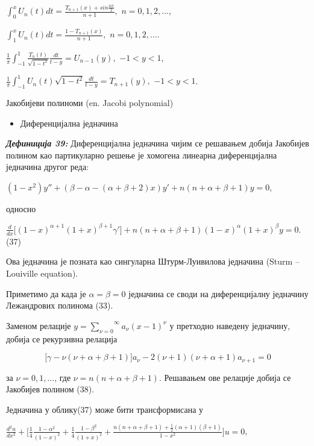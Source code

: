 \(\int_{0}^{x}U_{n}(t)dt = \frac{T_{n + 1}\overset{}{(x)} + sin\frac{n\pi}{2}}{n + 1},\)
\(n = 0,1,2,...\),

\(\int_{1}^{x}U_{n}(t)dt = \frac{1 - T_{n + 1}\overset{}{(x)}}{n + 1},\)
\(n = 0,1,2,...\).

\(\frac{1}{\pi}\int_{- 1}^{1}\frac{T_{n}\overset{}{(t)}}{\sqrt{1 - t^{2}}}\frac{dt}{t - y} = U_{n - 1}(y),\)
\(- 1 < y < 1\),

\(\frac{1}{\pi}\int_{- 1}^{1}U_{n}(t)\sqrt{1 - t^{2}}\frac{dt}{t - y} = T_{n + 1}(y),\)
\(- 1 < y < 1\).

Јакобијеви полиноми (en. Jacobi polynomial)

\begin{itemize}
\item
  Диференцијална једначина
\end{itemize}

\emph{\textbf{Дефиниција 39:}} Диференцијална једначина чијим се
решавањем добија Јакобијев полином као партикуларно решење је хомогена
линеарна диференцијална једначина другог реда:

\((1 - x^{2})y'' + (\beta - \alpha - (\alpha + \beta + 2)x)y' + n(n + \alpha + \beta + 1)y = 0\),

односно

\(\frac{d}{dx}\lbrack{(1 - x)}^{\alpha + 1}{(1 + x)}^{\beta + 1}\gamma'\rbrack + n(n + \alpha + \beta + 1){(1 - x)}^{\alpha}{(1 + x)}^{\beta}y = 0\).
(37)

Ова једначина је позната као сингуларна Штурм-Луивилова једначина (Sturm
-- Louiville equation).

Приметимо да када је \(\alpha = \beta = 0\) једначина се своди на
диференцијалну једначину Лежандрових полинома (33).

Заменом релације
\(y = \overset{\infty}{\sum_{\nu = 0}}a_{\nu}{(x - 1)}^{\nu}\) у
претходно наведену једначину, добија се рекурзивна релација

\[\lbrack\gamma - \nu(\nu + \alpha + \beta + 1)\rbrack a_{\nu} - 2(\nu + 1)(\nu + \alpha + 1)a_{\nu + 1} = 0\]

за \(\nu = 0,1,...\), где \(\nu = n(n + \alpha + \beta + 1)\). Решавањем
ове релације добија се Јакобијев полином (38).

Једначина у облику(37) може бити трансформисана у

\(\frac{d^{2}u}{dx^{2}} + \lbrack\frac{1}{4}\frac{1 - \alpha^{2}}{{(1 - x)}^{2}} + \frac{1}{4}\frac{1 - \beta^{2}}{{(1 + x)}^{2}} + \frac{n(n + \alpha + \beta + 1) + \frac{1}{2}(\alpha + 1)(\beta + 1)}{1 - x^{2}}\rbrack u = 0\),


